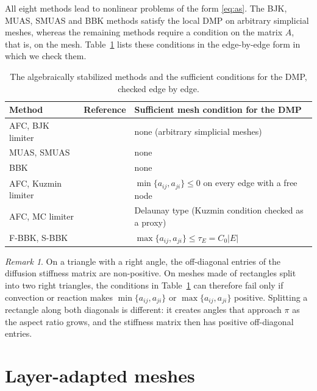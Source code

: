\documentclass[11pt,a4paper]{article}
\theoremstyle{remark}
\newtheorem{remark}{Remark}[section]
\begin{document}
All eight methods lead to nonlinear problems of the form \eqref{eq:as}. The BJK, MUAS, SMUAS and BBK methods satisfy
the local DMP on arbitrary simplicial meshes, whereas the remaining methods require a condition on the matrix $A$,
that is, on the mesh. Table~\ref{tab:methods} lists these conditions in the edge-by-edge form in which we check them.

\begin{table}[!htbp]
\centering\small
\caption{The algebraically stabilized methods and the sufficient conditions for the DMP, checked edge by
edge.}\label{tab:methods}
\begin{tabular}{lll}
\toprule
Method & Reference & Sufficient mesh condition for the DMP\\
\midrule
AFC, BJK limiter & \cite{BJK17} & none (arbitrary simplicial meshes)\\
MUAS, SMUAS & \cite{JK22,Kno23} & none\\
BBK & \cite{BBK17} & none\\
AFC, Kuzmin limiter & \cite{Kuz07,BJK16} & $\min\{a_{ij},a_{ji}\}\le0$ on every edge with a free node\\
AFC, MC limiter & \cite{Kuz20,AJ27} & Delaunay type (Kuzmin condition checked as a proxy)\\
F-BBK, S-BBK & \cite{ABR17} & $\max\{a_{ij},a_{ji}\}\le\tau_E=C_0|E|$\\
\bottomrule
\end{tabular}
\end{table}

\begin{remark}
On a triangle with a right angle, the off-diagonal entries of the diffusion stiffness matrix are non-positive. On
meshes made of rectangles split into two right triangles, the conditions in Table~\ref{tab:methods} can therefore
fail only if convection or reaction makes $\min\{a_{ij},a_{ji}\}$ or $\max\{a_{ij},a_{ji}\}$ positive. Splitting a
rectangle along both diagonals is different: it creates angles that approach $\pi$ as the aspect ratio grows, and the
stiffness matrix then has positive off-diagonal entries.
\end{remark}

\section{Layer-adapted meshes}\label{sec:meshes}
\end{document}
